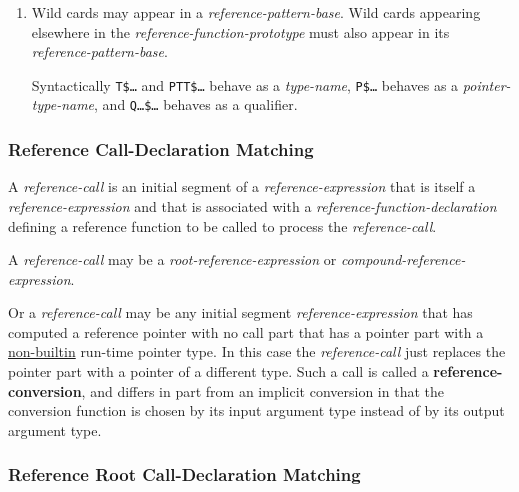 \documentclass[12pt]{article}
\newcommand{\key}[1]{{\rm \bfseries #1}}
\begin{document}
\begin{enumerate}
\begin{itemize}
\item
have no {\em function-variable-name} and no {\em member-name},
but have index lists of the same length
\item
have no {\em function-variable-name}, no {\em member-name},
and no index list
\end{itemize}
If there are two,
one must have the {\tt load} {\em reference-function-specifier},
the other must have the {\tt store}
{\em reference-function-specifier}, and both must have identical
{\em reference-pattern-index-declarations} (or both can have no
{\em reference-pattern-index-declarations}).
\item
Wild cards may appear in a {\em reference-pattern-base}.
Wild cards appearing elsewhere in the {\em reference-function-prototype}
must also appear in its {\em reference-pattern-base}.

Syntactically {\tt T\$\ldots} and {\tt PTT\$\ldots} behave as
a {\em type-name},
{\tt P\$\ldots} behaves as a {\em pointer-type-name},
and {\tt Q\ldots\$\ldots} behaves as a qualifier.
\end{enumerate}

\subsubsection{Reference Call-Declaration Matching}
\label{REFERENCE-CALL-DECLARATION-MATCHING}

A {\em reference-call} is an initial segment of a {\em reference-expression}
that is itself a {\em reference-expression} and that is associated
with a {\em reference-function-declaration} defining a reference function
to be called to process the {\em reference-call}.

A {\em reference-call} may be a {\em root-reference-expression}
or {\em compound-reference-expression}.

Or a {\em reference-call} may be any initial segment {\em reference-expression}
that has computed a reference pointer with no call part that has a
pointer part with a \underline{non-builtin} run-time pointer type.
In this case the {\em reference-call} just replaces the pointer part
with a pointer of a different type.  Such a call is called
a \key{reference-conversion}, and differs in part from an implicit
conversion in that the conversion function is chosen by its input
argument type instead of by its output argument type.


\subsubsection{Reference Root Call-Declaration Matching}
\label{REFERENCE-ROOT-CALL-DECLARATION-MATCHING}
\end{document}
